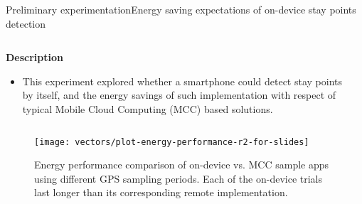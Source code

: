 \begin{frame}[noframenumbering]{Preliminary experimentation}{Energy saving expectations of on-device stay points detection}
\small
\begin{columns}
\begin{column}{0.55\textwidth}
\begin{block}{\small \textbf{Description}}
\begin{itemize}
  \item This experiment explored whether a smartphone could detect stay points by itself, and the energy savings of such implementation with respect of typical Mobile Cloud Computing (MCC) based solutions.
\end{itemize}
\end{block}
\end{column}

\begin{column}{0.4\textwidth}
\begin{table}
\centering
\renewcommand{\arraystretch}{0.8}
\caption{Input parameters for the energy saving expectations of on-device stay points detection experiment.}
\end{table}
\end{column}
\end{columns}

\begin{figure}
  \centering
  \texttt{[image: vectors/plot-energy-performance-r2-for-slides]}
  \caption{Energy performance comparison of on-device vs. MCC sample apps using different GPS sampling periods. Each of the on-device trials last longer than its corresponding remote implementation.}
\end{figure}

\end{frame}


